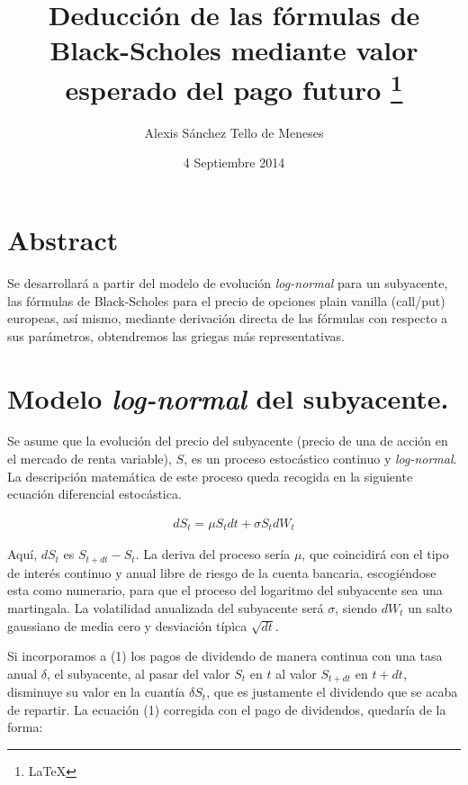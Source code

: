 \documentclass[12pt]{article}
\title{Deducci\'{o}n de las f\'{o}rmulas de Black-Scholes mediante valor esperado del pago futuro \footnote{\LaTeX}}
\author{Alexis S\'{a}nchez Tello de Meneses}
\date{4 Septiembre 2014}
\begin{document}
\maketitle

\section{Abstract}

Se desarrollar\'{a} a partir del modelo de evoluci\'{o}n {\em log-normal} para un subyacente, las f\'{o}rmulas de
Black-Scholes para el precio de opciones plain vanilla (call/put) europeas, as\'{i} mismo, mediante derivaci\'{o}n directa
de las f\'{o}rmulas con respecto a sus par\'{a}metros, obtendremos las griegas m\'{a}s representativas.

\section{Modelo {\em log-normal} del subyacente.}

Se asume que la evoluci\'{o}n del precio del subyacente (precio de una de acci\'{o}n en el mercado de
renta variable), $S$, es un proceso estoc\'{a}stico continuo y {\em log-normal}. La descripci\'{o}n
matem\'{a}tica de este proceso queda recogida en la siguiente ecuaci\'{o}n diferencial estoc\'{a}stica.
\newline

\begin{eqnarray}
	dS_{t} = \mu S_{t}dt + \sigma S_{t}dW_{t}
\end{eqnarray}
\newline

Aqu\'{i}, $dS_{t}$ es $S_{t+dt}-S_{t}$. La deriva del proceso ser\'{i}a $\mu$, que coincidir\'{a} con el tipo de 
inter\'{e}s continuo y anual libre de riesgo de la cuenta bancaria, escogi\'{e}ndose esta como numerario, para que el
proceso del logaritmo del subyacente sea una martingala. La volatilidad anualizada del subyacente ser\'{a} $\sigma$,
siendo $dW_{t}$ un salto gaussiano de media cero y desviaci\'{o}n t\'{i}pìca $\sqrt{dt}$.
\newline

Si incorporamos a (1) los pagos de dividendo de manera continua con una tasa anual $\delta$, el subyacente, al pasar del
valor $S_{t}$ en $t$ al valor $S_{t+dt}$ en $t+dt$, disminuye su valor en la cuant\'{i}a $\delta S_{t}$, que es 
justamente el dividendo que se acaba de repartir. La ecuaci\'{o}n (1) corregida con el pago de dividendos, quedar\'{i}a de
la forma:
\newline
\end{document}
